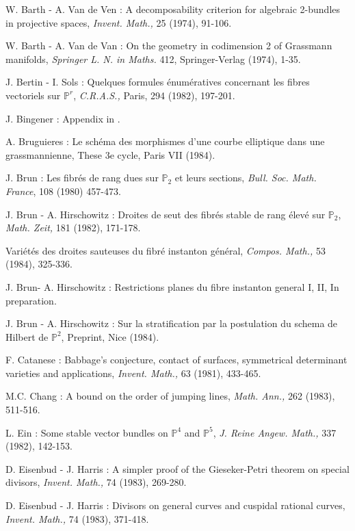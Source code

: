 \begin{thebibliography}{}
 W. Barth - A. Van de Ven : A decomposability criterion for algebraic 2-bundles in projective spaces, {\em Invent. Math.,} 25 (1974), 91-106. 

 W. Barth - A. Van de Van : On the geometry in codimension 2 of Grassmann manifolds, {\em Springer L. N. in Maths.} 412, Springer-Verlag (1974), 1-35.

 J. Bertin - I. Sols : Quelques formules \'enum\'eratives concernant les fibres vectoriels sur $\mathbb{P}^{r}$, {\em C.R.A.S.,} Paris, 294 (1982), 197-201.

 J. Bingener : Appendix in \cite{chap6-BH2}.

 A. Bruguieres : Le sch\'ema des morphismes d'une courbe elliptique dans une grassmannienne, These 3e cycle, Paris VII (1984).

 J. Brun : Les fibr\'es de rang dues sur $\mathbb{P}_{2}$ et leurs sections, {\em Bull. Soc. Math. France}, 108 (1980) 457-473.

 J. Brun - A. Hirschowitz : Droites de seut des fibr\'es stable de rang \'elev\'e sur $\mathbb{P}_{2}$, {\em Math. Zeit,} 181 (1982), 171-178. 

 Vari\'et\'es des droites sauteuses du fibr\'e instanton g\'en\'eral, {\em Compos. Math.,} 53 (1984), 325-336. 

 J. Brun\pageoriginale - A. Hirschowitz : Restrictions planes du fibre instanton general I, II, In preparation.

 J. Brun - A. Hirschowitz : Sur la stratification par la postulation du schema de Hilbert de $\mathbb{P}^{2}$, Preprint, Nice (1984).

 F. Catanese : Babbage's conjecture, contact of surfaces, symmetrical determinant varieties and applications, {\em Invent. Math.,} 63 (1981), 433-465.

 M.C. Chang : A bound on the order of jumping lines, {\em Math. Ann.,} 262 (1983), 511-516.

 L. Ein : Some stable vector bundles on $\mathbb{P}^{4}$ and $\mathbb{P}^{5}$, {\em J. Reine Angew. Math.,} 337 (1982), 142-153.

 D. Eisenbud - J. Harris : A simpler proof of the Gieseker-Petri theorem on special divisors, {\em Invent. Math.,} 74 (1983), 269-280.

 D. Eisenbud - J. Harris : Divisors on general curves and cuspidal rational curves, {\em Invent. Math.,} 74 (1983), 371-418.


\end{thebibliography}
